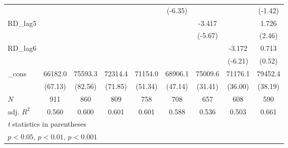 {\begin{tabular}{l*{8}{c}}
            &                     &                     &                     &                     &     (-6.35)         &                     &                     &     (-1.42)         \\
\addlinespace
RD\_lag5     &                     &                     &                     &                     &                     &      -3.417\sym{***}&                     &       1.726\sym{*}  \\
            &                     &                     &                     &                     &                     &     (-5.67)         &                     &      (2.46)         \\
\addlinespace
RD\_lag6     &                     &                     &                     &                     &                     &                     &      -3.172\sym{***}&       0.713         \\
            &                     &                     &                     &                     &                     &                     &     (-6.21)         &      (0.52)         \\
\addlinespace
\_cons      &     66182.0\sym{***}&     75593.3\sym{***}&     72314.4\sym{***}&     71154.0\sym{***}&     68906.1\sym{***}&     75009.6\sym{***}&     71176.1\sym{***}&     79452.4\sym{***}\\
            &     (67.13)         &     (82.56)         &     (71.85)         &     (51.34)         &     (47.14)         &     (31.41)         &     (36.00)         &     (38.19)         \\
\midrule
\(N\)       &         911         &         860         &         809         &         758         &         708         &         657         &         608         &         590         \\
adj. \(R^{2}\)&       0.560         &       0.600         &       0.601         &       0.601         &       0.588         &       0.536         &       0.503         &       0.661         \\
\bottomrule
\multicolumn{9}{l}{\footnotesize \textit{t} statistics in parentheses}\\
\multicolumn{9}{l}{\footnotesize \sym{*} \(p<0.05\), \sym{**} \(p<0.01\), \sym{***} \(p<0.001\)}\\
\end{tabular}
}

